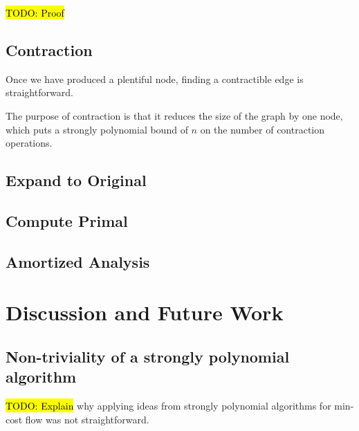 \documentclass[11pt]{article}
\theoremstyle{definition}
\theoremstyle{definition}
\newcommand{\todo}[1]{\hl{TODO: #1}}
\begin{document}
\todo{Proof}

\subsection{Contraction}

Once we have produced a plentiful node, finding a contractible edge is straightforward. 

The purpose of contraction is that it reduces the size of the graph by one node,
which puts a strongly polynomial bound of $n$ on the number of contraction
operations. 
\subsection{Expand to Original}
\subsection{Compute Primal}
\subsection{Amortized Analysis}





\section{Discussion and Future Work}

\subsection{Non-triviality of a strongly polynomial algorithm}

\todo{Explain} why applying ideas from strongly polynomial algorithms for
min-cost flow was not straightforward. 

\setlength{\bibitemsep}{0pt}
\nocite{*}
\printbibliography
\end{document}
